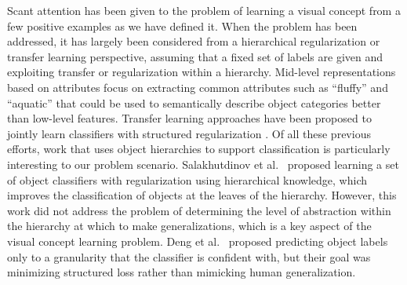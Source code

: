 Scant attention has been given to the problem of learning a visual concept from a few positive examples as we have defined it. When the problem has been
addressed, it has largely been considered from a hierarchical regularization
\cite{salakhutdinov2011learning} or transfer learning
\cite{quattoni2008transfer} perspective, assuming that a fixed
set of labels are given and exploiting transfer or regularization within a
hierarchy. Mid-level representations based on attributes
\cite{farhadi2009describing,parikh2011relative} focus on extracting common
attributes such as ``fluffy'' and ``aquatic'' that could be used to
semantically describe object categories better than low-level
features. Transfer learning approaches have been proposed to jointly learn
classifiers with structured regularization \cite{quattoni2008transfer}. Of all these previous efforts, work
that uses object hierarchies to support classification is particularly interesting to our problem scenario. Salakhutdinov et
al.~\cite{salakhutdinov2011learning} proposed learning a set of object
classifiers with regularization using hierarchical knowledge, which
improves the classification of objects at the leaves of the hierarchy.
However, this work did not address the problem of determining the level of
abstraction within the hierarchy at which to make generalizations, which
is a key aspect of the visual concept learning problem. Deng et
al.~\cite{deng2012hedging} proposed predicting object labels only to a
granularity that the classifier is confident with, but their goal
was minimizing structured loss rather than mimicking human generalization.

